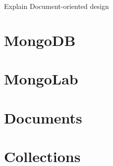 
Explain Document-oriented design 

\section{MongoDB}

\section{MongoLab}

\section{Documents}

\section{Collections}


